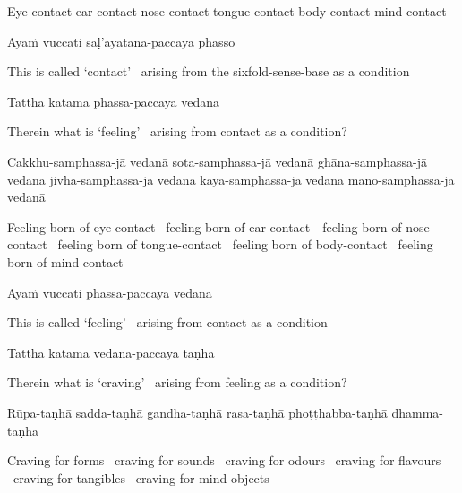 \begin{english-hang}
  Eye-contact ear-contact nose-contact tongue-contact body-contact mind-contact
\end{english-hang}

Ayaṁ vuccati saḷ'āyatana-paccayā phasso

\begin{english-hang}
  This is called `contact' \breathmark\ arising from the sixfold-sense-base as a condition
\end{english-hang}

Tattha katamā phassa-paccayā vedanā

\begin{english-hang}
  Therein what is `feeling' \breathmark\ arising from contact as a condition?
\end{english-hang}

\begin{pali-hang}
  Cakkhu-samphassa-jā vedanā sota-samphassa-jā vedanā ghāna-samphassa-jā vedanā jivhā-samphassa-jā vedanā kāya-samphassa-jā vedanā mano-samphassa-jā vedanā
\end{pali-hang}

\begin{english-hang-verses}
  Feeling born of eye-contact \breathmark\ feeling born of \mbox{ear-contact}~\breathmark\
  feeling born of nose-contact \breathmark\ feeling born of tongue-contact \breathmark\ feeling born of body-contact \breathmark\ feeling born of mind-contact
\end{english-hang-verses}

Ayaṁ vuccati phassa-paccayā vedanā

\begin{english-hang}
  This is called `feeling' \breathmark\ arising from contact as a condition
\end{english-hang}

Tattha katamā vedanā-paccayā taṇhā

\begin{english-hang}
  Therein what is `craving' \breathmark\ arising from feeling as a condition?
\end{english-hang}

\begin{pali-hang}
  Rūpa-taṇhā sadda-taṇhā gandha-taṇhā rasa-taṇhā phoṭṭhabba-taṇhā dhamma-taṇhā
\end{pali-hang}

\begin{english-hang}
  Craving for forms \breathmark\ craving for sounds \breathmark\ craving for odours \breathmark\ craving for flavours \breathmark\ craving for tangibles \breathmark\ craving for mind-objects
\end{english-hang}

